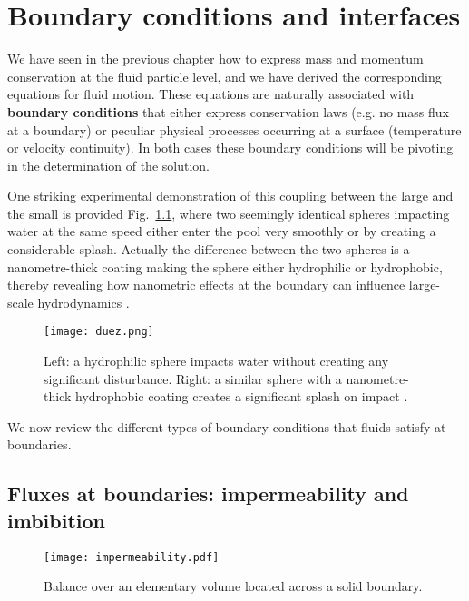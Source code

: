 \chapter{Boundary conditions and interfaces}
\label{chap:boundary_conditions}
We have seen in the previous chapter how to express mass and momentum conservation at the fluid particle level, and we have derived the corresponding equations for fluid motion. These equations are naturally associated with \textbf{boundary conditions} that either express conservation laws (e.g. no mass flux at a boundary) or peculiar physical processes occurring at a surface (temperature or velocity continuity). In both cases these boundary conditions will be pivoting in the determination of the solution.

One striking experimental demonstration of this coupling between the large and the small is provided Fig.~\ref{fig:splash_no_splash}, where two seemingly identical spheres impacting water at the same speed either enter the pool very smoothly or by creating a considerable splash. Actually the difference between the two spheres is a nanometre-thick coating making the sphere either hydrophilic or hydrophobic, thereby revealing how nanometric effects at the boundary can influence large-scale hydrodynamics \citep{Duez2007,Eggers2007}.
\setlength{\unitlength}{1cm}
\begin{figure}[htbp]
\begin{center}
\texttt{[image: duez.png]}
\caption{Left: a hydrophilic sphere impacts water without creating any significant disturbance. Right: a similar sphere with a nanometre-thick hydrophobic coating creates a significant splash on impact \citep{Duez2007}.}
\label{fig:splash_no_splash}
\end{center}
\end{figure}

We now review the different types of boundary conditions that fluids satisfy at boundaries.
\section{Fluxes at boundaries: impermeability and imbibition}
\begin{figure}[htbp]
\begin{center}
\texttt{[image: impermeability.pdf]}
\caption{Balance over an elementary volume located across a solid boundary.}
\label{fig:impermeability}
\end{center}
\end{figure}

